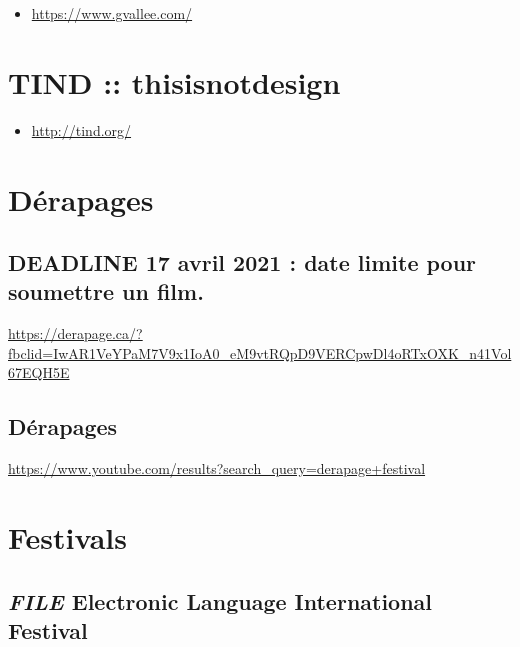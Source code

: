\documentclass[
]{book}
\providecommand{\tightlist}{%
  \setlength{\itemsep}{0pt}\setlength{\parskip}{0pt}}
\begin{document}
\begin{itemize}
\tightlist
\item
  \url{https://www.gvallee.com/}
\end{itemize}

\hypertarget{tind-thisisnotdesign}{%
\section{TIND :: thisisnotdesign}\label{tind-thisisnotdesign}}

\begin{itemize}
\tightlist
\item
  \url{http://tind.org/}
\end{itemize}

\hypertarget{duxe9rapages}{%
\section{Dérapages}\label{duxe9rapages}}

\hypertarget{deadline-17-avril-2021-date-limite-pour-soumettre-un-film.}{%
\subsection{DEADLINE 17 avril 2021 : date limite pour soumettre un film.}\label{deadline-17-avril-2021-date-limite-pour-soumettre-un-film.}}

\url{https://derapage.ca/?fbclid=IwAR1VeYPaM7V9x1IoA0_eM9vtRQpD9VERCpwDl4oRTxOXK_n41Vol67EQH5E}

\hypertarget{duxe9rapages-1}{%
\subsection{Dérapages}\label{duxe9rapages-1}}

\url{https://www.youtube.com/results?search_query=derapage+festival}

\hypertarget{festivals}{%
\section{Festivals}\label{festivals}}

\hypertarget{file-electronic-language-international-festival}{%
\subsection{\texorpdfstring{\emph{FILE} Electronic Language International Festival}{FILE Electronic Language International Festival}}\label{file-electronic-language-international-festival}}
\end{document}
